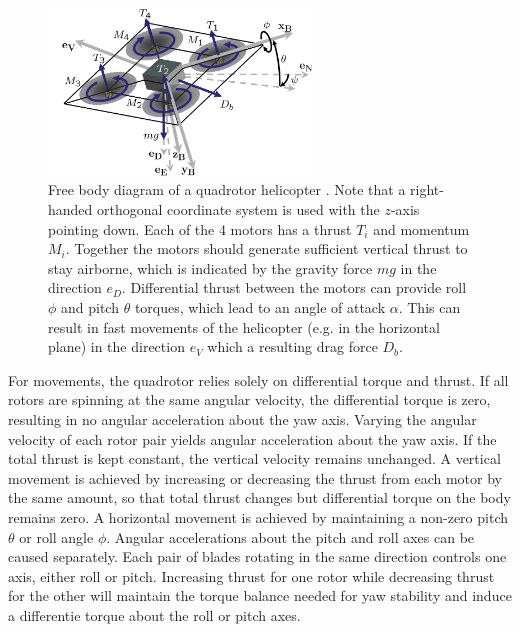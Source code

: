 
\begin{figure}[htb]
\centering
\includegraphics[width=7cm]{images/QuadRotorBody.png}
\caption{Free body diagram of a quadrotor helicopter 
\cite{Hoffmann2007}. Note that a right-handed orthogonal coordinate system is used with the $z$-axis pointing down. Each of the 4 motors has a thrust $T_i$ and momentum $M_i$. Together the motors should generate sufficient vertical thrust to stay airborne, which is indicated by the gravity force $mg$ in the direction $e_D$. Differential thrust between the motors can provide roll $\phi$ and pitch $\theta$ torques, which lead to an angle of attack $\alpha$. This can result in fast movements of the helicopter (e.g. in the horizontal plane) in the direction $e_V$ which a resulting drag force $D_b$. }
\label{fig:QuadRotorBody}
\end{figure}

For movements, the quadrotor relies solely on differential torque and thrust.
If all rotors are spinning at the same angular velocity, the differential torque is zero, resulting in no angular acceleration about the yaw axis.
Varying the angular velocity of each rotor pair yields angular acceleration about the yaw axis.
If the total thrust is kept constant, the vertical velocity remains unchanged.
A vertical movement is achieved by increasing or decreasing the thrust from each motor by the same amount, so that total thrust changes but differential torque on the body remains zero. 
A horizontal movement is achieved by maintaining a non-zero pitch $\theta$ or roll angle $\phi$.
Angular accelerations about the pitch and roll axes can be caused separately.
Each pair of blades rotating in the same direction controls one axis, either roll or pitch.
Increasing thrust for one rotor while decreasing thrust for the other will maintain the torque balance needed for yaw stability and induce a differentie torque about the roll or pitch axes. 

